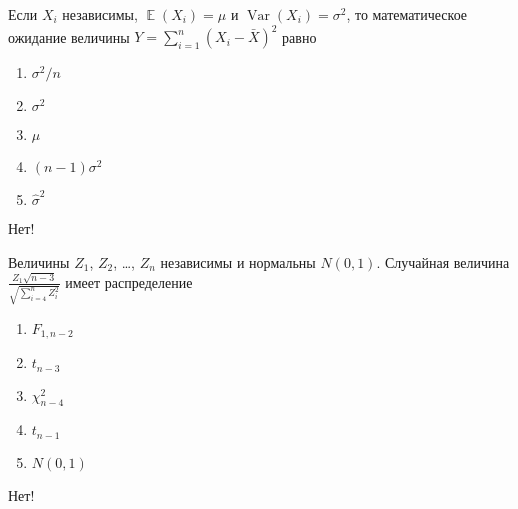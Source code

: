 \documentclass[t]{beamer}
\DeclareMathOperator{\Var}{Var}
\DeclareMathOperator{\E}{\mathbb{E}}
\begin{document}
 \begin{frame} \label{35-No} 
\begin{block}{35} 

Если $X_i$ независимы, $\E(X_i)=\mu$ и $\Var(X_i)=\sigma^2$, то математическое ожидание величины $Y=\sum_{i=1}^{n}(X_i-\bar{X})^2$ равно
 


 \end{block} 
\begin{enumerate} 
\item[] \hyperlink{35-No}{\beamergotobutton{} $\sigma^2/n$}
\item[] \hyperlink{35-No}{\beamergotobutton{} $\sigma^2$}
\item[] \hyperlink{35-No}{\beamergotobutton{} $\mu$}
\item[] \hyperlink{35-Yes}{\beamergotobutton{} $(n-1)\sigma^2$}
\item[] \hyperlink{35-No}{\beamergotobutton{} $\hat\sigma^2$}
\end{enumerate} 

 \alert{Нет!} 
\end{frame} 


 \begin{frame} \label{36-No} 
\begin{block}{36} 

Величины $Z_1$, $Z_2$, \ldots, $Z_n$ независимы и нормальны $N(0,1)$. Случайная величина $\frac{Z_1\sqrt{n-3}}{\sqrt{\sum_{i=4}^n Z_i^2}}$ имеет распределение
 


 \end{block} 
\begin{enumerate} 
\item[] \hyperlink{36-No}{\beamergotobutton{} $F_{1,n-2}$}
\item[] \hyperlink{36-Yes}{\beamergotobutton{} $t_{n-3}$}
\item[] \hyperlink{36-No}{\beamergotobutton{} $\chi^2_{n-4}$}
\item[] \hyperlink{36-No}{\beamergotobutton{} $t_{n-1}$}
\item[] \hyperlink{36-No}{\beamergotobutton{} $N(0,1)$}
\end{enumerate} 

 \alert{Нет!} 
\end{frame} 
\end{document}
